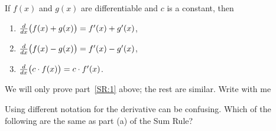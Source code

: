 \documentclass{ximera}
\begin{document}
\begin{theorem}\label{theorem:sum rule}
	If $f(x)$ and $g(x)$ are differentiable and $c$ is a constant, then 
	\begin{enumerate}
		\item\label{SR:1} $\frac{d}{\mathop{}\!d x} \big( f(x) + g(x)\big) = f'(x) + g'(x)$,
		\item $\frac{d}{\mathop{}\!d x} \big( f(x) - g(x)\big) = f'(x) - g'(x)$,
		\item $\frac{d}{\mathop{}\!d x} \big(c\cdot f(x)\big) = c\cdot f'(x)$.
	\end{enumerate}
	
	\begin{explanation}
		We will only prove part~\ref{SR:1} above; the rest are similar. Write with me
		\begin{image}
		\end{image}
	\end{explanation}
\end{theorem}

\begin{question}
  Using different notation for the derivative can be confusing.  Which of the
  following are the same as part (a) of the Sum Rule?
  \begin{selectAll}
  \end{selectAll}
\end{question}
\end{document}
